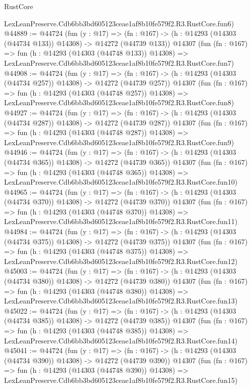 \begin{lexlean}{RustCore}
\begin{coremodule}
    LexLeanPreserve.Cdb6bb3bd605123ceae1af8b10fe579f2.R3.RustCore.fun6)
@44889 := @44724
    (fun (y : @17) =>
    (fn : @167) -> (h : @14293 (@14303 (@44734 @133)) @14308) -> @14272 (@44739 @133))
    @14307
    (fun (fn : @167) =>
    fun (h : @14293 (@14303 (@44748 @133)) @14308) =>
    LexLeanPreserve.Cdb6bb3bd605123ceae1af8b10fe579f2.R3.RustCore.fun7)
@44908 := @44724
    (fun (y : @17) =>
    (fn : @167) -> (h : @14293 (@14303 (@44734 @257)) @14308) -> @14272 (@44739 @257))
    @14307
    (fun (fn : @167) =>
    fun (h : @14293 (@14303 (@44748 @257)) @14308) =>
    LexLeanPreserve.Cdb6bb3bd605123ceae1af8b10fe579f2.R3.RustCore.fun8)
@44927 := @44724
    (fun (y : @17) =>
    (fn : @167) -> (h : @14293 (@14303 (@44734 @287)) @14308) -> @14272 (@44739 @287))
    @14307
    (fun (fn : @167) =>
    fun (h : @14293 (@14303 (@44748 @287)) @14308) =>
    LexLeanPreserve.Cdb6bb3bd605123ceae1af8b10fe579f2.R3.RustCore.fun9)
@44946 := @44724
    (fun (y : @17) =>
    (fn : @167) -> (h : @14293 (@14303 (@44734 @365)) @14308) -> @14272 (@44739 @365))
    @14307
    (fun (fn : @167) =>
    fun (h : @14293 (@14303 (@44748 @365)) @14308) =>
    LexLeanPreserve.Cdb6bb3bd605123ceae1af8b10fe579f2.R3.RustCore.fun10)
@44965 := @44724
    (fun (y : @17) =>
    (fn : @167) -> (h : @14293 (@14303 (@44734 @370)) @14308) -> @14272 (@44739 @370))
    @14307
    (fun (fn : @167) =>
    fun (h : @14293 (@14303 (@44748 @370)) @14308) =>
    LexLeanPreserve.Cdb6bb3bd605123ceae1af8b10fe579f2.R3.RustCore.fun11)
@44984 := @44724
    (fun (y : @17) =>
    (fn : @167) -> (h : @14293 (@14303 (@44734 @375)) @14308) -> @14272 (@44739 @375))
    @14307
    (fun (fn : @167) =>
    fun (h : @14293 (@14303 (@44748 @375)) @14308) =>
    LexLeanPreserve.Cdb6bb3bd605123ceae1af8b10fe579f2.R3.RustCore.fun12)
@45003 := @44724
    (fun (y : @17) =>
    (fn : @167) -> (h : @14293 (@14303 (@44734 @380)) @14308) -> @14272 (@44739 @380))
    @14307
    (fun (fn : @167) =>
    fun (h : @14293 (@14303 (@44748 @380)) @14308) =>
    LexLeanPreserve.Cdb6bb3bd605123ceae1af8b10fe579f2.R3.RustCore.fun13)
@45022 := @44724
    (fun (y : @17) =>
    (fn : @167) -> (h : @14293 (@14303 (@44734 @385)) @14308) -> @14272 (@44739 @385))
    @14307
    (fun (fn : @167) =>
    fun (h : @14293 (@14303 (@44748 @385)) @14308) =>
    LexLeanPreserve.Cdb6bb3bd605123ceae1af8b10fe579f2.R3.RustCore.fun14)
@45041 := @44724
    (fun (y : @17) =>
    (fn : @167) -> (h : @14293 (@14303 (@44734 @390)) @14308) -> @14272 (@44739 @390))
    @14307
    (fun (fn : @167) =>
    fun (h : @14293 (@14303 (@44748 @390)) @14308) =>
    LexLeanPreserve.Cdb6bb3bd605123ceae1af8b10fe579f2.R3.RustCore.fun15)

\end{coremodule}
\end{lexlean}
